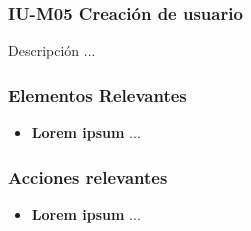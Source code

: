 
\subsubsection{IU-M05 Creación de usuario}

 Descripción ...


\subsubsection{Elementos Relevantes}

    \begin{itemize}
    \item {\bf Lorem ipsum}
        ...
    \end{itemize}

\subsubsection{Acciones relevantes}

    \begin{itemize}
    \item {\bf Lorem ipsum}
        ...
    \end{itemize}

\clearpage
